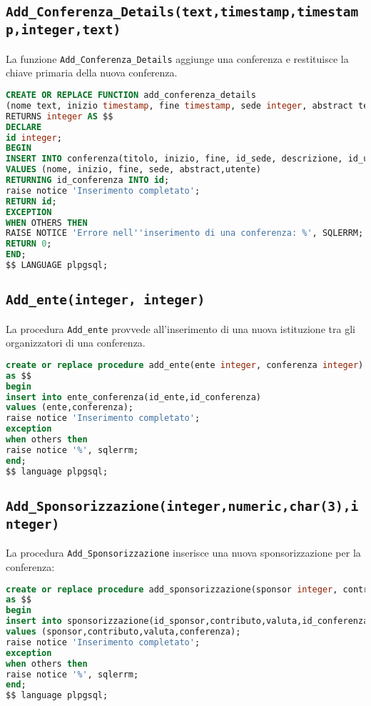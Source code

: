 \subsection{\texttt{Add\_Conferenza\_Details(text,timestamp,timestamp,integer,text)}}
La funzione \texttt{Add\_Conferenza\_Details} aggiunge una conferenza e restituisce la chiave primaria della nuova conferenza.
\begin{lstlisting}[language=SQL,style=mystyle]
CREATE OR REPLACE FUNCTION add_conferenza_details
(nome text, inizio timestamp, fine timestamp, sede integer, abstract text, utente integer)
RETURNS integer AS $$
DECLARE
id integer;
BEGIN
INSERT INTO conferenza(titolo, inizio, fine, id_sede, descrizione, id_utente) 
VALUES (nome, inizio, fine, sede, abstract,utente)
RETURNING id_conferenza INTO id;
raise notice 'Inserimento completato';
RETURN id;
EXCEPTION
WHEN OTHERS THEN
RAISE NOTICE 'Errore nell''inserimento di una conferenza: %', SQLERRM;
RETURN 0; 
END;
$$ LANGUAGE plpgsql;
\end{lstlisting}
\subsection{\texttt{Add\_ente(integer, integer)}}
La procedura \texttt{Add\_ente} provvede all'inserimento di una nuova istituzione tra gli organizzatori di una conferenza.
\begin{lstlisting}[language=SQL,style=mystyle]
create or replace procedure add_ente(ente integer, conferenza integer)
as $$
begin
insert into ente_conferenza(id_ente,id_conferenza)
values (ente,conferenza);
raise notice 'Inserimento completato';
exception
when others then
raise notice '%', sqlerrm;
end;
$$ language plpgsql;
\end{lstlisting}
\subsection{\texttt{Add\_Sponsorizzazione(integer,numeric,char(3),integer)}}
La procedura \texttt{Add\_Sponsorizzazione} inserisce una nuova sponsorizzazione per la conferenza:
\begin{lstlisting}[language=SQL, style=mystyle]
create or replace procedure add_sponsorizzazione(sponsor integer, contributo numeric(1000,2), valuta char(3), conferenza integer)
as $$
begin
insert into sponsorizzazione(id_sponsor,contributo,valuta,id_conferenza)
values (sponsor,contributo,valuta,conferenza);
raise notice 'Inserimento completato';
exception
when others then
raise notice '%', sqlerrm;
end;
$$ language plpgsql;
\end{lstlisting}
